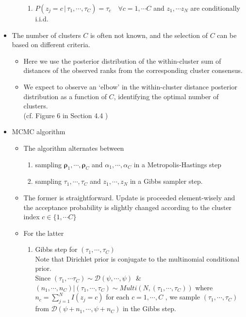 \documentclass[12pt]{article}
\begin{document}
\begin{itemize}
\begin{itemize}
\begin{enumerate}
            \item $P(z_j=c \,|\, \tau_1, \cdots, \tau_C)=\tau_c \quad \forall c=1,\cdots C$ and $z_1, \cdots z_N$ are conditionally i.i.d.
        \end{enumerate}
    \end{itemize}
    \item The number of clusters $C$ is often not known, and the selection of $C$ can be based on different criteria.
    \begin{itemize}
        \item Here we use the posterior distribution of the within-cluster sum of distances of the observed ranks from the corresponding cluster consensus.
        \item We expect to observe an `elbow' in the within-cluster distance posterior distribution as a function of $C$, identifying the optimal number of clusters. \\ (cf. Figure 6 in Section 4.4 )
    \end{itemize}
    \item MCMC algorithm
    \begin{itemize}
        \item The algorithm alternates between 
        \begin{enumerate}
            \item sampling $\boldsymbol{\rho}_1, \cdots, \boldsymbol{\rho}_C$ and $\alpha_1, \cdots, \alpha_C$ in a Metropolis-Hastings step
            \item sampling $\tau_1, \cdots, \tau_C$ and $z_1, \cdots, z_N$ in a Gibbs sampler step.
        \end{enumerate}
        \item The former is straightforward. Update is proceeded element-wisely and the acceptance probability is slightly changed according to the cluster index $c\in \{1,\cdots C\}$
        \item For the latter
        \begin{enumerate}
            \item Gibbs step for $(\tau_1, \cdots, \tau_C)$ \\ Note that Dirichlet prior is conjugate to the multinomial conditional prior. \\ Since $(\tau_1, \cdots \tau_C)\sim \mathcal{D}(\psi, \cdots, \psi)$ \,\& $(n_1, \cdots, n_C)|(\tau_1, \cdots, \tau_C)\sim Multi(N, (\tau_1, \cdots, \tau_C))$ where $n_c=\sum_{j=1}^N I(z_j=c)$ for each $c=1, \cdots ,C$\; , we sample $(\tau_1, \cdots, \tau_C)$ from $\mathcal{D}(\psi+n_1, \cdots, \psi+n_C)$ in the Gibbs step. 

\end{enumerate}
\end{itemize}
\end{itemize}
\end{document}
